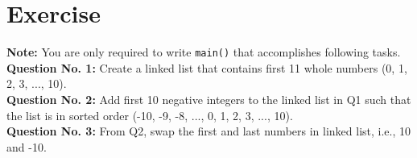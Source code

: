 \documentclass[12pt,a4paper]{article}
\begin{document}
\section{Exercise}
\noindent\textbf{Note: }You are only required to write \texttt{main()} that accomplishes following tasks.\\
\noindent\textbf{Question No. 1:} Create a linked list that contains first 11 whole numbers (0, 1, 2, 3, ..., 10).\\
\noindent\textbf{Question No. 2:} Add first 10 negative integers to the linked list in Q1 such that the list is in sorted order (-10, -9, -8, ..., 0, 1, 2, 3, ..., 10).\\
\noindent\textbf{Question No. 3:} From Q2, swap the first and last numbers in linked list, i.e., 10 and -10.\\
\end{document}
